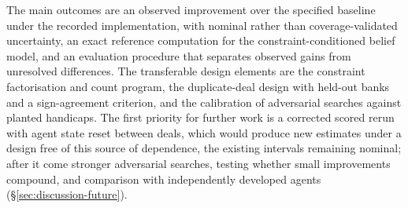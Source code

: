 The main outcomes are an observed improvement over the specified baseline under the recorded
implementation, with nominal rather than coverage-validated uncertainty, an exact reference
computation for the constraint-conditioned belief model, and an evaluation procedure that separates
observed gains from unresolved differences. The transferable design elements are the constraint
factorisation and count program, the duplicate-deal design with held-out banks and a sign-agreement
criterion, and the calibration of adversarial searches against planted handicaps. The first priority for
further work is a corrected scored rerun with agent state reset between deals, which would produce
new estimates under a design free of this source of dependence, the existing intervals remaining
nominal; after it come stronger
adversarial searches, testing whether small improvements compound, and comparison with
independently developed agents (\S\ref{sec:discussion-future}).
